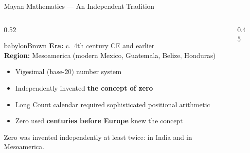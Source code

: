 \begin{frame}[shrink=25]{Mayan Mathematics --- An Independent Tradition}

  \begin{columns}[T]
    \begin{column}{0.52\textwidth}
      \begin{personbox}{babylonBrown}
        \small
        \textbf{Era:} c.\ 4th century CE and earlier\\
        \textbf{Region:} Mesoamerica (modern Mexico, Guatemala, Belize, Honduras)
      \end{personbox}

      \vspace{0.4em}
      \begin{itemize}
        \item \alert{Vigesimal} (base-20) number system
        \item Independently invented \textbf{the concept of zero}
        \item Long Count calendar required sophisticated positional arithmetic
        \item Zero used \textbf{centuries before Europe} knew the concept
      \end{itemize}

      \vspace{0.3em}
      \begin{insightbox}
        Zero was invented independently at least twice: in India and in Mesoamerica.
      \end{insightbox}
    \end{column}

    \begin{column}{0.45\textwidth}

      \vspace{0.3em}
    \end{column}
  \end{columns}

\end{frame}

